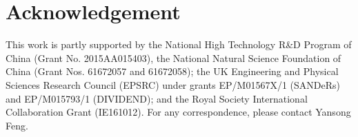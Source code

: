 \section*{Acknowledgement}
This work is partly supported by the National High Technology R\&D Program of China (Grant No. 2015AA015403), the National Natural Science
Foundation of China (Grant Nos. 61672057 and 61672058); the UK Engineering and Physical Sciences Research Council (EPSRC) under grants
EP/M01567X/1 (SANDeRs) and EP/M015793/1 (DIVIDEND); and the Royal Society International Collaboration Grant (IE161012). For any
correspondence, please contact Yansong Feng.
